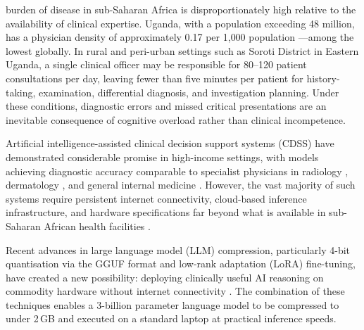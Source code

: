 \documentclass[journal]{IEEEtran}
\begin{document}
 burden of disease in sub-Saharan Africa is
disproportionately high relative to the availability of clinical
expertise. Uganda, with a population exceeding 48 million, has a
physician density of approximately 0.17 per 1{,}000 population
\cite{who2023workforce}---among the lowest globally. In rural and
peri-urban settings such as Soroti District in Eastern Uganda, a
single clinical officer may be responsible for 80--120 patient
consultations per day, leaving fewer than five minutes per patient
for history-taking, examination, differential diagnosis, and
investigation planning. Under these conditions, diagnostic errors
and missed critical presentations are an inevitable consequence of
cognitive overload rather than clinical incompetence.

Artificial intelligence-assisted clinical decision support systems
(CDSS) have demonstrated considerable promise in high-income
settings, with models achieving diagnostic accuracy comparable to
specialist physicians in radiology \cite{rajpurkar2022ai},
dermatology \cite{esteva2017dermatologist}, and general internal
medicine \cite{mcdermott2021comprehensive}. However, the vast
majority of such systems require persistent internet connectivity,
cloud-based inference infrastructure, and hardware specifications
far beyond what is available in sub-Saharan African health
facilities \cite{nkosi2023challenges}.

Recent advances in large language model (LLM) compression,
particularly 4-bit quantisation via the GGUF format and low-rank
adaptation (LoRA) fine-tuning, have created a new possibility:
deploying clinically useful AI reasoning on commodity hardware
without internet connectivity \cite{dettmers2023qlora,gerganov2023llamacpp}.
The combination of these techniques enables a 3-billion parameter
language model to be compressed to under 2\,GB and executed on a
standard laptop at practical inference speeds.
\end{document}
